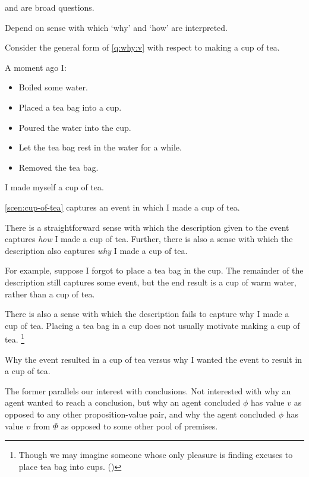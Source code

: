\begin{note}
  \qWhy{} and \qHow{} are broad questions.

  Depend on sense with which `why' and `how' are interpreted.
\end{note}

\begin{note}
  Consider the general form of \autoref{q:why:v} with respect to making a cup of tea.

  \begin{scenario}
    \label{scen:cup-of-tea}
    A moment ago I:
    \begin{itemize}[noitemsep]
    \item
      Boiled some water.
    \item
      Placed a tea bag into a cup.
    \item
      Poured the water into the cup.
    \item
      Let the tea bag rest in the water for a while.
    \item
      Removed the tea bag.
    \end{itemize}
    I made myself a cup of tea.
  \end{scenario}

  \autoref{scen:cup-of-tea} captures an event in which I made a cup of tea.

  There is a straightforward sense with which the description given to the event captures \emph{how} I made a cup of tea.
  Further, there is also a sense with which the description also captures \emph{why} I made a cup of tea.

  For example, suppose I forgot to place a tea bag in the cup.
  The remainder of the description still captures some event, but the end result is a cup of warm water, rather than a cup of tea.

  There is also a sense with which the description fails to capture why I made a cup of tea.
  Placing a tea bag in a cup does not usually motivate making a cup of tea.%
  \footnote{
    Though we may imagine someone whose only pleasure is finding excuses to place tea bag into cups.
    (\cite[Cf.][379--380]{Rawls:1999aa})
  }

  Why the event resulted in a cup of tea versus why I wanted the event to result in a cup of tea.

  The former parallels our interest with conclusions.
  Not interested with why an agent wanted to reach a conclusion, but why an agent concluded \(\phi\) has value \(v\) as opposed to any other proposition-value pair, and why the agent concluded \(\phi\) has value \(v\) from \(\Phi\) as opposed to some other pool of premises.
\end{note}

